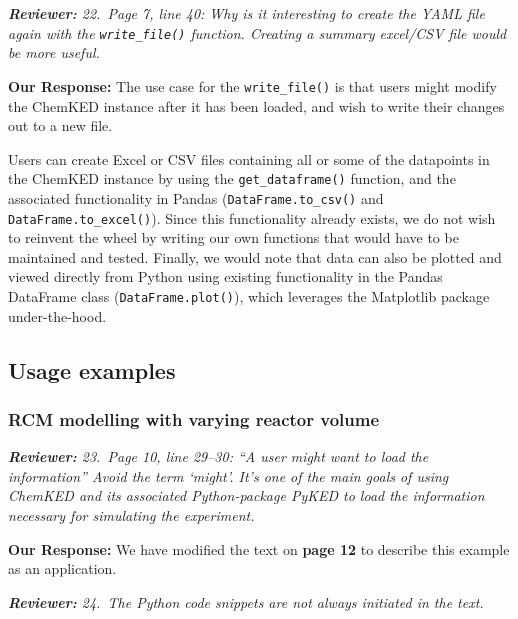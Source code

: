 \documentclass[a4paper,10pt]{elsarticle}
\newenvironment{reviewer}{\vspace{0.5\baselineskip}\begingroup\itshape\textbf{Reviewer:}}{\endgroup}
\newenvironment{response}{\textbf{Our Response:}}{\vspace{0.5\baselineskip}}
\begin{document}
\begin{reviewer}
    22.~Page 7, line 40: Why is it interesting to create the YAML file again with the
    \texttt{write\_file()} function. Creating a summary excel/CSV file would be more useful.
\end{reviewer}

\begin{response}
    The use case for the \texttt{write\_file()} is that users might modify the ChemKED instance
    after it has been loaded, and wish to write their changes out to a new file.

    Users can create Excel or CSV files containing all or some of the datapoints in the ChemKED
    instance by using the \verb|get_dataframe()| function, and the associated functionality in
    Pandas (\verb|DataFrame.to_csv()| and \verb|DataFrame.to_excel()|). Since this functionality
    already exists, we do not wish to reinvent the wheel by writing our own functions that would
    have to be maintained and tested. Finally, we would note that data can also be plotted and
    viewed directly from Python using existing functionality in the Pandas DataFrame class
    (\verb|DataFrame.plot()|), which leverages the Matplotlib package under-the-hood.
\end{response}

\subsection*{Usage examples}
\subsubsection*{RCM modelling with varying reactor volume}

\begin{reviewer}
    23.~Page 10, line 29--30: ``A user might want to load the information'' Avoid the term `might'.
    It's one of the main goals of using ChemKED and its associated Python-package PyKED to load the
    information necessary for simulating the experiment.
\end{reviewer}

\begin{response}
    We have modified the text on \textbf{page 12} to describe this example as an application.
\end{response}

\begin{reviewer}
    24.~The Python code snippets are not always initiated in the text.
\end{reviewer}
\end{document}
